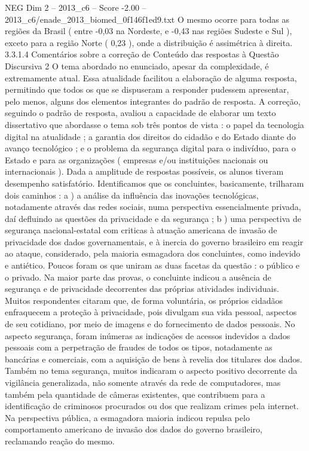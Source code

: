 \begin{textsample}{NEG Dim 2 – 2013\_c6 – Score -2.00 – 2013\_c6/enade\_2013\_biomed\_0f146f1ed9.txt}
O mesmo ocorre para todas as regiões da Brasil ( entre -0,03 na Nordeste, e -0,43 nas regiões Sudeste e Sul ), exceto para a região Norte ( 0,23 ), onde a distribuição é assimétrica à direita. 3.3.1.4 Comentários sobre a correção de Conteúdo das respostas à Questão Discursiva 2 O tema abordado no enunciado, apesar da complexidade, é extremamente atual.
Essa atualidade facilitou a elaboração de alguma resposta, permitindo que todos os que se dispuseram a responder pudessem apresentar, pelo menos, alguns dos elementos integrantes do padrão de resposta.
A correção, seguindo o padrão de resposta, avaliou a capacidade de elaborar um texto dissertativo que abordasse o tema sob três pontos de vista : o papel da tecnologia digital na atualidade ; a garantia dos direitos do cidadão e do Estado diante do avanço tecnológico ; e o problema da segurança digital para o indivíduo, para o Estado e para as organizações ( empresas e/ou instituições nacionais ou internacionais ).
Dada a amplitude de respostas possíveis, os alunos tiveram desempenho satisfatório.
Identificamos que os concluintes, basicamente, trilharam dois caminhos : a ) a análise da influência das inovações tecnológicas, notadamente através das redes sociais, numa perspectiva essencialmente privada, daí defluindo as questões da privacidade e da segurança ; b ) uma perspectiva de segurança nacional-estatal com criticas à atuação americana de invasão de privacidade dos dados governamentais, e à inercia do governo brasileiro em reagir ao ataque, considerado, pela maioria esmagadora dos concluintes, como indevido e antiético.
Poucos foram os que uniram as duas facetas da questão : o público e o privado.
Na maior parte das provas, o concluinte indicou a ausência de segurança e de privacidade decorrentes das próprias atividades individuais.
Muitos respondentes citaram que, de forma voluntária, os próprios cidadãos enfraquecem a proteção à privacidade, pois divulgam sua vida pessoal, aspectos de seu cotidiano, por meio de imagens e do fornecimento de dados pessoais.
No aspecto segurança, foram inúmeras as indicações de acessos indevidos a dados pessoais com a perpetração de fraudes de todos os tipos, notadamente as bancárias e comerciais, com a aquisição de bens à revelia dos titulares dos dados.
Também no tema segurança, muitos indicaram o aspecto positivo decorrente da vigilância generalizada, não somente através da rede de computadores, mas também pela quantidade de câmeras existentes, que contribuem para a identificação de criminosos procurados ou dos que realizam crimes pela internet.
Na perspectiva pública, a esmagadora maioria indicou repulsa pelo comportamento americano de invasão dos dados do governo brasileiro, reclamando reação do mesmo.

\end{textsample}
